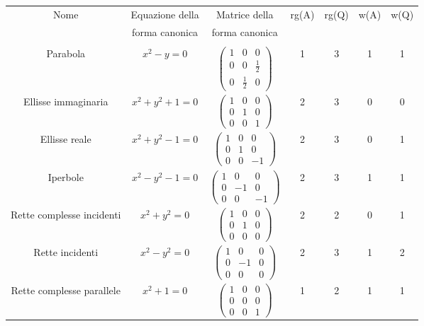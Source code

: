  \begin{tabular}{|c|c|c|c|c|c|c|}
  \hline
  Nome & Equazione della & Matrice della & rg(A) & rg(Q) & w(A) & w(Q)\\
   &  forma canonica & forma canonica & & & & \\
  \hline
  & & & & & & \\
  Parabola&$x^2-y=0$& $\left(\begin{smallmatrix}1 & 0 & 0 \\ 0 & 0 &\frac{1}{2}\\ 0 &\frac{1}{2} & 0\end{smallmatrix}\right)$& 1 & 3 & 1 &1\\
  Ellisse immaginaria&$x^2+y^2+1=0$&$\left(\begin{smallmatrix} 1 & 0 & 0 \\ 0 & 1 & 0 \\ 0 & 0 & 1 \end{smallmatrix}\right)$&2&3&0&0\\
  Ellisse reale&$x^2+y^2-1=0$&$\left(\begin{smallmatrix} 1 & 0 & 0 \\ 0 & 1 & 0 \\ 0 & 0 & -1 \end{smallmatrix}\right)$&2&3&0&1\\
  Iperbole&$x^2-y^2-1=0$&$\left(\begin{smallmatrix} 1 & 0 & 0 \\ 0 & -1 & 0 \\ 0 & 0 & -1 \end{smallmatrix}\right)$&2&3&1&1\\
  Rette complesse incidenti&$x^2+y^2=0$&$\left(\begin{smallmatrix} 1 & 0 & 0 \\ 0 & 1 & 0 \\ 0 & 0 & 0 \end{smallmatrix}\right)$&2&2&0&1\\
  Rette incidenti&$x^2-y^2=0$&$\left(\begin{smallmatrix} 1 & 0 & 0 \\ 0 & -1 & 0 \\ 0 & 0 & 0 \end{smallmatrix}\right)$&2&3&1&2\\
  Rette complesse parallele&$x^2+1=0$&$\left(\begin{smallmatrix} 1 & 0 & 0 \\ 0 & 0 & 0 \\ 0 & 0 & 1 \end{smallmatrix}\right)$&1&2&1&1\\

\end{tabular}
